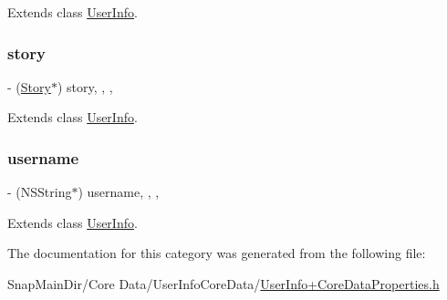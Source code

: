 Extends class \hyperlink{interface_user_info_afdfa30db3ce1f305298e33e693e626e8}{User\+Info}.

\hypertarget{category_user_info_07_core_data_properties_08_afeb3aca2ca38cb9b64ca84ee98e90260}{}\label{category_user_info_07_core_data_properties_08_afeb3aca2ca38cb9b64ca84ee98e90260} 
\subsubsection{\texorpdfstring{story}{story}}
{\footnotesize\ttfamily -\/ (\hyperlink{interface_story}{Story}$\ast$) story\hspace{0.3cm}{\ttfamily [read]}, {\ttfamily [write]}, {\ttfamily [nonatomic]}, {\ttfamily [retain]}}



Extends class \hyperlink{interface_user_info_afeb3aca2ca38cb9b64ca84ee98e90260}{User\+Info}.

\hypertarget{category_user_info_07_core_data_properties_08_a678541351323dc073a5696e15f0b3f3c}{}\label{category_user_info_07_core_data_properties_08_a678541351323dc073a5696e15f0b3f3c} 
\subsubsection{\texorpdfstring{username}{username}}
{\footnotesize\ttfamily -\/ (N\+S\+String$\ast$) username\hspace{0.3cm}{\ttfamily [read]}, {\ttfamily [write]}, {\ttfamily [nonatomic]}, {\ttfamily [retain]}}



Extends class \hyperlink{interface_user_info_a678541351323dc073a5696e15f0b3f3c}{User\+Info}.



The documentation for this category was generated from the following file\+:\begin{DoxyCompactItemize}
\item 
Snap\+Main\+Dir/\+Core Data/\+User\+Info\+Core\+Data/\hyperlink{_user_info_09_core_data_properties_8h}{User\+Info+\+Core\+Data\+Properties.\+h}\end{DoxyCompactItemize}
